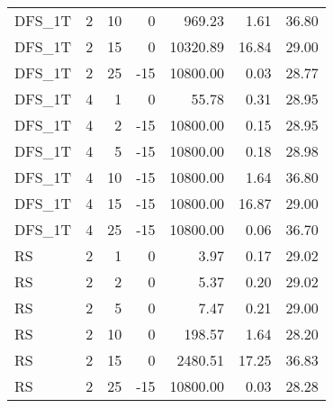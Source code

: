 \begin{center}
\begin{longtable}{lrrrrrr}
  DFS\_1T     & 2 & 10 &   0 & 969.23 & 1.61 & 36.80 \\ 
  DFS\_1T     & 2 & 15 &   0 & 10320.89 & 16.84 & 29.00 \\ 
  DFS\_1T     & 2 & 25 & -15 & 10800.00 & 0.03 & 28.77 \\ 
  DFS\_1T     & 4 & 1 &   0 & 55.78 & 0.31 & 28.95 \\ 
  DFS\_1T     & 4 & 2 & -15 & 10800.00 & 0.15 & 28.95 \\ 
  DFS\_1T     & 4 & 5 & -15 & 10800.00 & 0.18 & 28.98 \\ 
  DFS\_1T     & 4 & 10 & -15 & 10800.00 & 1.64 & 36.80 \\ 
  DFS\_1T     & 4 & 15 & -15 & 10800.00 & 16.87 & 29.00 \\ 
  DFS\_1T     & 4 & 25 & -15 & 10800.00 & 0.06 & 36.70 \\ 
  RS     & 2 & 1 &   0 & 3.97 & 0.17 & 29.02 \\ 
  RS     & 2 & 2 &   0 & 5.37 & 0.20 & 29.02 \\ 
  RS     & 2 & 5 &   0 & 7.47 & 0.21 & 29.00 \\ 
  RS     & 2 & 10 &   0 & 198.57 & 1.64 & 28.20 \\ 
  RS     & 2 & 15 &   0 & 2480.51 & 17.25 & 36.83 \\ 
  RS     & 2 & 25 & -15 & 10800.00 & 0.03 & 28.28 \\ 

\end{longtable}
\end{center}
